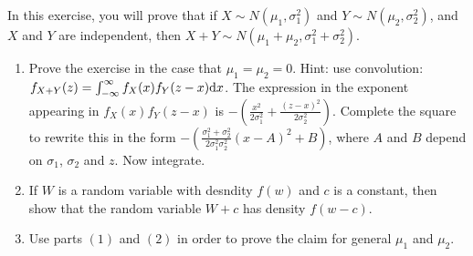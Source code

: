 \documentclass[11pt,a4paper]{article}
\begin{document}
\begin{exercise}
  \label{ex:six-two}
  In this exercise, you will prove that if $X \sim N(\mu_1,\sigma_1^2)$
  and $Y \sim N(\mu_2,\sigma_2^2)$, and $X$ and $Y$ are independent,
  then $X + Y \sim N(\mu_1 + \mu_2, \sigma_1^2 + \sigma_2^2)$.
  \begin{enumerate}
    \item[(1)] Prove the exercise in the case that $\mu_1 = \mu_2 = 0$. 
      Hint: use convolution:
      $f_{X+Y}(z) = \int_{-\infty}^{\infty} f_X(x) f_Y(z - x) \dx$.
      The expression in the exponent appearing in $f_X(x) f_Y(z - x)$
      is $-(\frac{x^2}{2\sigma_1^2} + \frac{(z - x)^2}{2\sigma_2^2})$. 
      Complete the square to rewrite this in the form
      $-(\frac{\sigma_1^2 + \sigma_2^2}{2\sigma_1^2 \sigma_2^2}(x - A)^2 + B)$,
      where $A$ and $B$ depend on $\sigma_1$, $\sigma_2$ and $z$. 
      Now integrate.
    \item[(2)] If $W$ is a random variable with desndity $f(w)$ and $c$
      is a constant, then show
      that the random variable $W + c$ has density $f(w - c)$.
    \item[(3)] Use parts $(1)$ and $(2)$ in order to prove the claim for general
      $\mu_1$ and $\mu_2$. 
  \end{enumerate}
\end{exercise}
\end{document}
